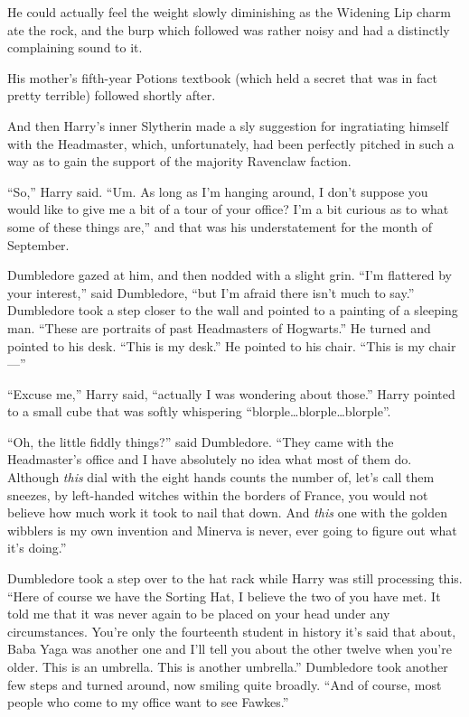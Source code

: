 He could actually feel the weight slowly diminishing as the Widening Lip charm ate the rock, and the burp which followed was rather noisy and had a distinctly complaining sound to it.

His mother’s fifth-year Potions textbook (which held a secret that was in fact pretty terrible) followed shortly after.

And then Harry’s inner Slytherin made a sly suggestion for ingratiating himself with the Headmaster, which, unfortunately, had been perfectly pitched in such a way as to gain the support of the majority Ravenclaw faction.

“So,” Harry said.
“Um. As long as I’m hanging around, I don’t suppose you would like to give me a bit of a tour of your office? I’m a bit curious as to what some of these things are,” and that was his understatement for the month of September.

Dumbledore gazed at him, and then nodded with a slight grin.
“I’m flattered by your interest,” said Dumbledore, “but I’m afraid there isn’t much to say.” Dumbledore took a step closer to the wall and pointed to a painting of a sleeping man.
“These are portraits of past Headmasters of Hogwarts.” He turned and pointed to his desk.
“This is my desk.” He pointed to his chair.
“This is my chair—”

“Excuse me,” Harry said, “actually I was wondering about those.” Harry pointed to a small cube that was softly whispering “blorple…blorple…blorple”.

“Oh, the little fiddly things?” said Dumbledore.
“They came with the Headmaster’s office and I have absolutely no idea what most of them do. Although \emph{this} dial with the eight hands counts the number of, let’s call them sneezes, by left-handed witches within the borders of France, you would not believe how much work it took to nail that down. And \emph{this} one with the golden wibblers is my own invention and Minerva is never, ever going to figure out what it’s doing.”

Dumbledore took a step over to the hat rack while Harry was still processing this.
“Here of course we have the Sorting Hat, I believe the two of you have met. It told me that it was never again to be placed on your head under any circumstances. You’re only the fourteenth student in history it’s said that about, Baba Yaga was another one and I’ll tell you about the other twelve when you’re older. This is an umbrella. This is another umbrella.” Dumbledore took another few steps and turned around, now smiling quite broadly.
“And of course, most people who come to my office want to see Fawkes.”

